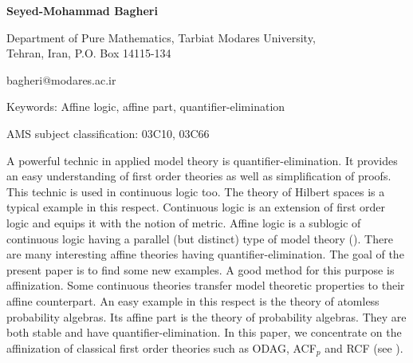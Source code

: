 \documentclass[12pt]{article}
\begin{document}
\begin{center}
{\Large{}}\vspace{6mm}  %

{\bf Seyed-Mohammad Bagheri}
\vspace{4mm}


{\footnotesize {\footnotesize Department of Pure Mathematics, %
Tarbiat Modares University,\\ Tehran, Iran, P.O. Box 14115-134}}
\vspace{1mm}

bagheri@modares.ac.ir %
\end{center}

\begin{abstract}
Quantifier-elimination or model-completeness of the affine part of some classical
first order theories are proved.
\end{abstract}

{\sc Keywords}: {\small Affine logic, affine part, quantifier-elimination}

{\small {\sc AMS subject classification: 03C10, 03C66}}
\bigskip

A powerful technic in applied model theory is quantifier-elimination.
It provides an easy understanding of first order theories as well as simplification of proofs.
This technic is used in continuous logic too. The theory of Hilbert spaces is a typical example in this respect.
Continuous logic \cite{BBHU, CK} is an extension of first order logic and equips it with the notion of metric.
Affine logic is a sublogic of continuous logic having a parallel (but distinct)
type of model theory (\cite{Bagheri-Lip, ACMT, Ibarlucia}).
There are many interesting affine theories having quantifier-elimination.
The goal of the present paper is to find some new examples. A good method for this purpose is affinization.
Some continuous theories transfer model theoretic properties to their affine counterpart.
An easy example in this respect is the theory of atomless probability algebras.
Its affine part is the theory of probability algebras. They are both stable and have quantifier-elimination.
In this paper, we concentrate on the affinization of classical first order theories
such as ODAG, ACF$_p$ and RCF (see \cite{Marker}).
\end{document}
